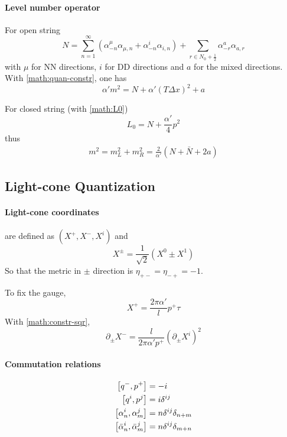 \documentclass[12pt, a4paper, DIV=15]{article}
\numberwithin{equation}{section}
\begin{document}
\paragraph{Level number operator}
For open string
\begin{equation}
	N = \sum_{n=1}^{\infty} (\alpha^\mu_{-n} \alpha_{\mu, n} + \alpha^i_{-n} \alpha_{i, n}) + \sum_{r \in N_0 + \frac{1}{2} } \alpha^a_{-r} \alpha_{a,r}
\end{equation}
with $\mu$ for NN directions, $i$ for DD directions and $a$ for the mixed directions. With \eqref{math:quan-constr}, one has
\begin{equation}
	\alpha' m^2 = N + \alpha' (T \Delta x)^2 + a
\end{equation}

For closed string (with \eqref{math:L0})
\begin{equation}
	L_0  = N + \frac{\alpha'}{4} p^2
\end{equation}
thus
\begin{align}
	m^2 = m_L^2 + m_R^2 = \frac{2}{\alpha'} \left( N + \bar{N} + 2a \right)
\end{align}



\subsection{Light-cone Quantization}
\paragraph{Light-cone coordinates} are defined as $(X^+, X^-, X^i)$ and
\begin{equation}
	X^\pm = \frac{1}{\sqrt{2}} (X^0 \pm X^1)
\end{equation}
So that the metric in $\pm$ direction is $\eta_{+-} = \eta_{-+} = -1$.

To fix the gauge, 
\begin{equation}
	X^+ = \frac{2\pi \alpha'}{l} p^+ \tau
\end{equation}
With \eqref{math:constr-sqr}, 
\begin{equation}
	\partial_\pm X^- = \frac{l}{2\pi \alpha' p^+} (\partial_\pm X^i)^2
\end{equation}

\paragraph{Commutation relations}
\begin{subequations}
\begin{align}
	\comm{q^-}{p^+} &= -i \\
	\comm{q^i}{p^j} &= i \delta^{ij} \\
	\comm{\alpha^i_n}{\alpha^j_m} &= n \delta^{ij} \delta_{n+m} \\
	\comm{\bar{\alpha}^i_n}{\bar{\alpha}^j_m} &= n \delta^{ij} \delta_{m+n}
\end{align}
\end{subequations}
\end{document}
